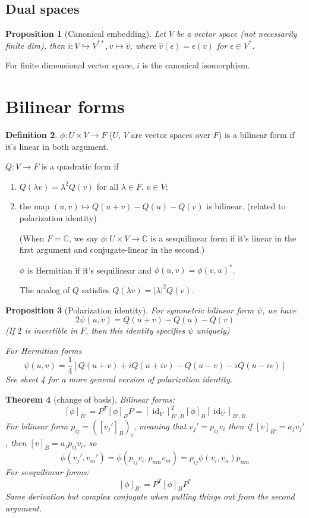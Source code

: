 \documentclass{article}
\theoremstyle{definition}
\newtheorem{defn}{Definition}[section]
\theoremstyle{remark}
\theoremstyle{plain}
\newtheorem{thm}[defn]{Theorem}
\newtheorem{prop}[defn]{Proposition}
\newcommand{\CC}{\mathbb{C}}
\begin{document}
\subsection{Dual spaces}
\begin{prop}[Canonical embedding]
    Let $V$ be a vector space (not necessarily finite dim), then $i:V\hookrightarrow V^{**}, v\mapsto \hat v$, where $\hat v(\epsilon)=\epsilon(v)$ for $\epsilon\in V^\ast$.
\end{prop}
For finite dimensional vector space, $i$ is the canonical isomorphism.

\section{Bilinear forms}
\begin{defn}
$\phi:U\times V\to F$ ($U$, $V$ are vector spaces over $F$) is a bilinear form if it's linear in both argument.%

$Q:V\to F$ is a quadratic form if 
\begin{enumerate}
    \item $Q(\lambda v)=\lambda^2Q(v)$ for all $\lambda\in F$, $v\in V$;
    \item the map $(u,v)\mapsto Q(u+v)-Q(u)-Q(v)$ is bilinear. (related to polarization identity)

(When $F=\CC$, we say $\phi:U\times V\to \CC$ is a sesquilinear form if it's linear in the first argument and conjugate-linear in the second.)

$\phi$ is Hermitian if it's sequilinear and $\phi(u,v)=\phi(v,u)^\ast$.

The analog of $Q$ satisfies $Q(\lambda v)=|\lambda|^2Q(v)$.
\end{enumerate}%
\end{defn}
\begin{prop}[Polarization identity]
For symmetric bilinear form $\psi$, we have
\[2\psi(u,v)=Q(u+v)-Q(u)-Q(v)\]
(If $2$ is invertible in $F$, then this identity specifies $\psi$ uniquely)

For Hermitian forms
\[\psi(u,v)=\dfrac{1}{4}\left[Q(u+v)+iQ(u+iv)-Q(u-v)-iQ(u-iv)\right]\]
See sheet 4 for a more general version of polarization identity.
\end{prop}
\begin{thm}[change of basis]
Bilinear forms:
\[[\phi]_{B'}=P^T[\phi]_B P=[\operatorname{id}_V]_{B',B}^T[\phi]_B[\operatorname{id}_V]_{B',B}\]
For bilinear form $p_{ij}=([v_j']_{B})_i$, meaning that $v_j'=p_{ij}v_i$ then if $[v]_{B'}=a_jv_j'$, then $[v]_{B}=a_jp_{ij}v_i$, so \[\phi(v_j',v_m')=\phi(p_{ij}v_i,p_{nm}v_m)=p_{ij}\phi(v_i,v_n)p_{nm}\]
For sesquilinear forms:
\[[\phi]_{B'}=P^T[\phi]_B P^\ast\]
Same derivation but complex conjugate when pulling things out from the second argument.
\end{thm}
\end{document}
